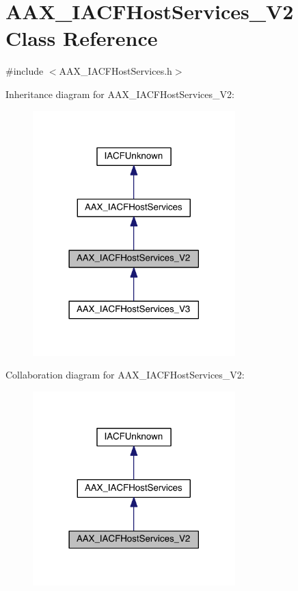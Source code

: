 \hypertarget{a00072}{}\section{A\+A\+X\+\_\+\+I\+A\+C\+F\+Host\+Services\+\_\+\+V2 Class Reference}
\label{a00072}


{\ttfamily \#include $<$A\+A\+X\+\_\+\+I\+A\+C\+F\+Host\+Services.\+h$>$}



Inheritance diagram for A\+A\+X\+\_\+\+I\+A\+C\+F\+Host\+Services\+\_\+\+V2\+:
\nopagebreak
\begin{figure}[H]
\begin{center}
\leavevmode
\includegraphics[width=222pt]{a00559}
\end{center}
\end{figure}


Collaboration diagram for A\+A\+X\+\_\+\+I\+A\+C\+F\+Host\+Services\+\_\+\+V2\+:
\nopagebreak
\begin{figure}[H]
\begin{center}
\leavevmode
\includegraphics[width=222pt]{a00560}
\end{center}
\end{figure}


